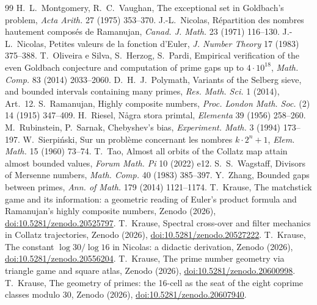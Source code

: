 \documentclass[11pt,a4paper]{article}
\theoremstyle{plain}
\theoremstyle{definition}
\theoremstyle{remark}
\begin{document}
\begin{thebibliography}{99}
 H.~L.~Montgomery, R.~C.~Vaughan, The exceptional set in
Goldbach's problem, \emph{Acta Arith.} 27 (1975) 353--370.
 J.-L.~Nicolas, Répartition des nombres hautement composés
de Ramanujan, \emph{Canad. J. Math.} 23 (1971) 116--130.
 J.-L.~Nicolas, Petites valeurs de la fonction d'Euler,
\emph{J. Number Theory} 17 (1983) 375--388.
 T.~Oliveira e Silva, S.~Herzog, S.~Pardi, Empirical
verification of the even Goldbach conjecture and computation of prime gaps up
to $4\cdot10^{18}$, \emph{Math. Comp.} 83 (2014) 2033--2060.
 D.~H.~J.~Polymath, Variants of the Selberg sieve, and
bounded intervals containing many primes, \emph{Res. Math. Sci.} 1 (2014),
Art.~12.
 S.~Ramanujan, Highly composite numbers, \emph{Proc. London
Math. Soc.} (2) 14 (1915) 347--409.
 H.~Riesel, Några stora primtal, \emph{Elementa} 39 (1956)
258--260.
 M.~Rubinstein, P.~Sarnak, Chebyshev's bias,
\emph{Experiment. Math.} 3 (1994) 173--197.
 W.~Sierpi\'{n}ski, Sur un problème concernant les nombres
$k\cdot2^n+1$, \emph{Elem. Math.} 15 (1960) 73--74.
 T.~Tao, Almost all orbits of the Collatz map attain almost
bounded values, \emph{Forum Math. Pi} 10 (2022) e12.
 S.~S.~Wagstaff, Divisors of Mersenne numbers, \emph{Math.
Comp.} 40 (1983) 385--397.
 Y.~Zhang, Bounded gaps between primes, \emph{Ann. of Math.}
179 (2014) 1121--1174.
 T.~Krause, The matchstick game and its information: a
geometric reading of Euler's product formula and Ramanujan's highly composite
numbers, Zenodo (2026), \href{https://doi.org/10.5281/zenodo.20525797}{doi:10.5281/zenodo.20525797}.
 T.~Krause, Spectral cross-over and filter mechanics in
Collatz trajectories, Zenodo (2026),
\href{https://doi.org/10.5281/zenodo.20527222}{doi:10.5281/zenodo.20527222}.
 T.~Krause, The constant $\log30/\log16$ in Nicolas: a
didactic derivation, Zenodo (2026),
\href{https://doi.org/10.5281/zenodo.20556204}{doi:10.5281/zenodo.20556204}.
 T.~Krause, The prime number geometry via triangle game and
square atlas, Zenodo (2026),
\href{https://doi.org/10.5281/zenodo.20600998}{doi:10.5281/zenodo.20600998}.
 T.~Krause, The geometry of primes: the 16-cell as the seat
of the eight coprime classes modulo 30, Zenodo (2026),
\href{https://doi.org/10.5281/zenodo.20607940}{doi:10.5281/zenodo.20607940}.

\end{thebibliography}
\end{document}
